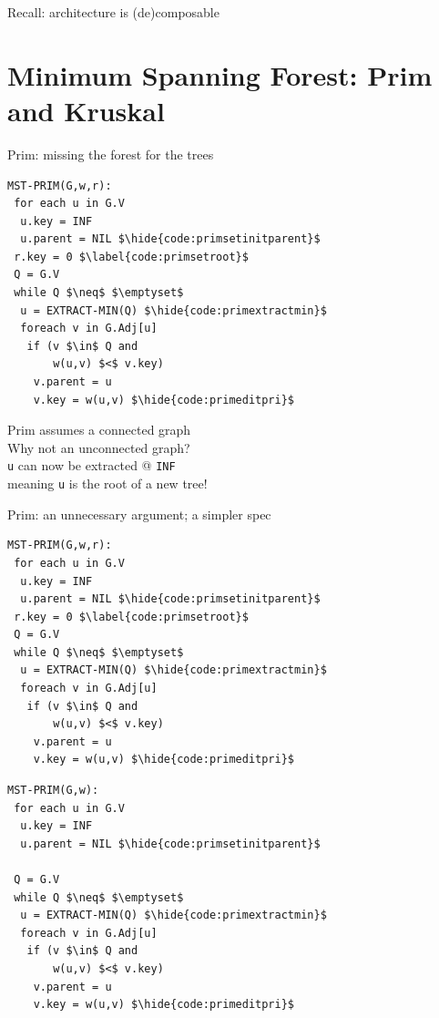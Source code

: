 \documentclass[usenames, xcolor=dvipsnames]{beamer}
\newcommand{\hide}[1]{}
\begin{document}
\begin{frame}{Recall: architecture is (de)composable}
  \centering
  \colorbox{lightg}{\scalebox{.85}{}}
\end{frame}

\section{Minimum Spanning Forest: Prim and Kruskal}

\begin{frame}[fragile]{Prim: missing the forest for the trees}

\begin{minipage}{0.48\textwidth}
\begin{lstlisting}
MST-PRIM(G,w,r):
 for each u in G.V
  u.key = INF
  u.parent = NIL $\hide{code:primsetinitparent}$
 r.key = 0 $\label{code:primsetroot}$
 Q = G.V
 while Q $\neq$ $\emptyset$
  u = EXTRACT-MIN(Q) $\hide{code:primextractmin}$
  foreach v in G.Adj[u]
   if (v $\in$ Q and 
       w(u,v) $<$ v.key)
    v.parent = u
    v.key = w(u,v) $\hide{code:primeditpri}$
\end{lstlisting} \end{minipage}
\begin{minipage}{0.5\textwidth}
\pause
Prim assumes a connected graph \\
\bigskip \pause
Why not an unconnected graph? \\
\bigskip \pause
\texttt{u} can now be extracted @ \texttt{INF} \\ 
\bigskip \pause
meaning \texttt{u} is the root of a new tree!
\end{minipage}

\end{frame}

\begin{frame}[fragile]{Prim: an unnecessary argument; a simpler spec}

\begin{minipage}{0.48\textwidth}
\begin{lstlisting}
MST-PRIM(G,w,r):
 for each u in G.V
  u.key = INF
  u.parent = NIL $\hide{code:primsetinitparent}$
 r.key = 0 $\label{code:primsetroot}$
 Q = G.V
 while Q $\neq$ $\emptyset$
  u = EXTRACT-MIN(Q) $\hide{code:primextractmin}$
  foreach v in G.Adj[u]
   if (v $\in$ Q and 
       w(u,v) $<$ v.key)
    v.parent = u
    v.key = w(u,v) $\hide{code:primeditpri}$
\end{lstlisting} \end{minipage}
\begin{minipage}{0.5\textwidth}
\begin{lstlisting}
MST-PRIM(G,w):
 for each u in G.V
  u.key = INF
  u.parent = NIL $\hide{code:primsetinitparent}$

 Q = G.V
 while Q $\neq$ $\emptyset$
  u = EXTRACT-MIN(Q) $\hide{code:primextractmin}$
  foreach v in G.Adj[u]
   if (v $\in$ Q and 
       w(u,v) $<$ v.key)
    v.parent = u
    v.key = w(u,v) $\hide{code:primeditpri}$
\end{lstlisting} 
\end{minipage} 
\end{frame}
\end{document}
